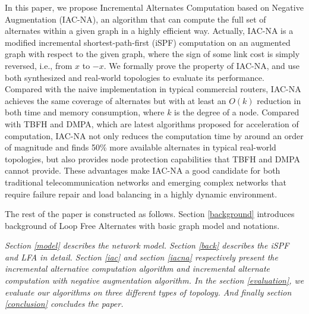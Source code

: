 In this paper, we propose Incremental Alternates Computation based on Negative
Augmentation (IAC-NA), an algorithm that can
compute the full set of alternates within a given graph in a highly efficient way.
Actually, IAC-NA is a modified incremental shortest-path-first (iSPF) computation
on an augmented graph with respect to the given graph, where the sign of some link cost
is simply reversed, i.e., from $x$ to $-x$. We formally prove the property of IAC-NA,
and use both synthesized and real-world topologies to evaluate its performance.
Compared with the naive implementation in typical commercial routers, IAC-NA achieves the same coverage of alternates but  
with at least an $O(k)$ reduction in both time and memory consumption, where $k$ is the degree of a node. 
Compared with TBFH and DMPA, which are latest algorithms proposed for acceleration of computation, 
IAC-NA not only reduces the computation time by around an order of magnitude
and finds 50\% more available alternates in typical real-world topologies, but also 
provides  node protection capabilities that TBFH and DMPA cannot provide.
These advantages make IAC-NA a good candidate for both traditional telecommunication networks
and emerging complex networks that require failure repair and load balancing
in a highly dynamic environment.
\iffalse
Our contributions are summarized as follows:
\begin{itemize}
\item We propose an incremental alternates computation (IAC) algorithm based on iSPF, which can compute all the next hops satisfied DC rule. %
\item Theoretical analysis indicates that the computation complexity of IAC is less than that of constructing a shortest path tree and  can provide the same network availability as DC.
\item We propose an IAC-NA algorithm which can  efficiently calculate
the minimum cost of all its neighbors to all other nodes of the
network on the shortest path tree rooted at the compute node. Therefore
IAC-NA can completely and efficiently deal with LFA problem.
\item Theoretical analysis and experiments results indicate that IAC-NA can provide the same network availability as LFA.
\end{itemize}
\fi

The rest of the paper is constructed as follows. 
Section \ref{background} introduces background of Loop Free Alternates with basic graph model and notations.

{\em Section \ref{model}  describes the network model.
Section \ref{back} describes the iSPF and LFA in detail.
Section \ref{iac} and section \ref{iacna} respectively present the incremental alternative computation algorithm and incremental alternate computation with negative augmentation algorithm.
In the section \ref{evaluation}, we evaluate our algorithms on three different types of topology.  And finally section \ref{conclusion} concludes the paper.
}




